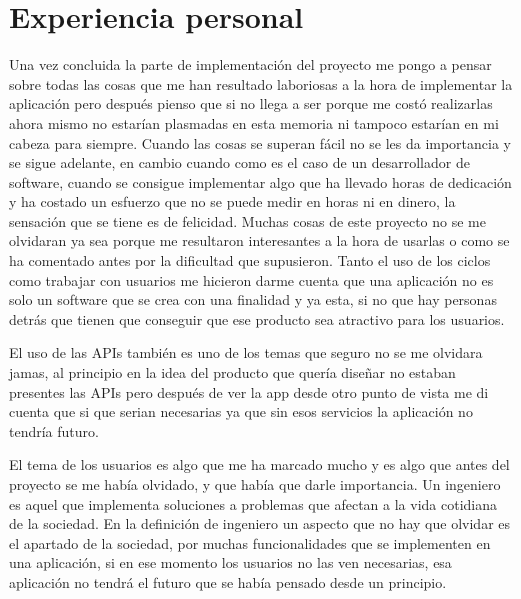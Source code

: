 \section{Experiencia personal}
\label{secc:Experiencia personal}

Una vez concluida la parte de implementación del proyecto me pongo a pensar sobre todas las cosas que me han resultado laboriosas a la hora de implementar la aplicación pero después pienso que si no llega a ser porque me costó realizarlas ahora mismo no estarían plasmadas en esta memoria ni tampoco estarían en mi cabeza para siempre. Cuando las cosas se superan fácil no se les da importancia y se sigue adelante, en cambio cuando como es el caso de un desarrollador de software, cuando se consigue implementar algo que ha llevado horas de dedicación y ha costado un esfuerzo que no se puede medir en horas ni en dinero, la sensación que se tiene es de felicidad. Muchas cosas de este proyecto no se me olvidaran ya sea porque me resultaron interesantes a la hora de usarlas o como se ha comentado antes por la dificultad que supusieron. Tanto el uso de los ciclos como trabajar con usuarios me hicieron darme cuenta que una aplicación no es solo un software que se crea con una finalidad y ya esta, si no que hay personas detrás que tienen que conseguir que ese producto sea atractivo para los usuarios. 

El uso de las APIs también es uno de los temas que seguro no se me olvidara jamas, al principio en la idea del producto que quería diseñar no estaban presentes las APIs pero después de ver la app desde otro punto de vista me di cuenta que si que serian necesarias ya que sin esos servicios la aplicación no tendría futuro.

El tema de los usuarios es algo que me ha marcado mucho y es algo que antes del proyecto se me había olvidado, y que había que darle importancia. Un ingeniero es aquel que implementa soluciones a problemas que afectan a la vida cotidiana de la sociedad. En la definición de ingeniero un aspecto que no hay que olvidar es el apartado de la sociedad, por muchas funcionalidades que se implementen en una aplicación, si en ese momento los usuarios no las ven necesarias, esa aplicación no tendrá el futuro que se había pensado desde un principio.

